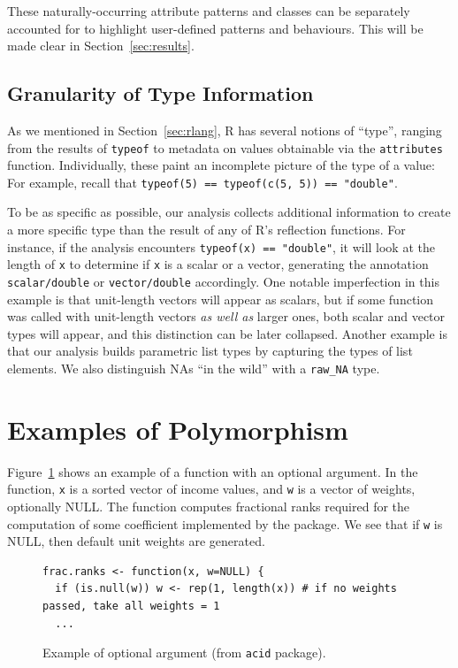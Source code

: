 \documentclass[acmsmall,10pt,review,anonymous]{acmart}\settopmatter{printfolios=true,printccs=false,printacmref=false}
\newcommand{\code}[1]{\lstinline|#1|\xspace}
\begin{document}
These naturally-occurring attribute patterns and classes can be separately
accounted for to highlight user-defined patterns and behaviours.  This will
be made clear in Section~\ref{sec:results}.

%
%

%
\subsection{Granularity of Type Information}

As we mentioned in Section~\ref{sec:rlang}, R has several notions of
``type'', ranging from the results of \code{typeof} to metadata on values
obtainable via the \code{attributes} function.  Individually, these paint an
incomplete picture of the type of a value: For example, recall that
\code{typeof(5) == typeof(c(5, 5)) == "double"}.

To be as specific as possible, our analysis collects additional information
to create a more specific type than the result of any of R's reflection
functions.  For instance, if the analysis encounters {\tt typeof(x) ==
  "double"}, it will look at the length of {\tt x} to determine if {\tt x}
is a scalar or a vector, generating the annotation {\tt scalar/double} or
{\tt vector/double} accordingly.  One notable imperfection in this example
is that unit-length vectors will appear as scalars, but if some function was
called with unit-length vectors {\it as well as} larger ones, both scalar
and vector types will appear, and this distinction can be later collapsed.
Another example is that our analysis builds parametric list types by
capturing the types of list elements.  We also distinguish NAs ``in the
wild'' with a {\tt raw\_NA} type.

%
%
%
%
%
%
\section{Examples of Polymorphism}
\label{sec:polyex}

Figure~\ref{fig:optnull} shows an example of a function with an optional argument.
In the function, {\tt x} is a sorted vector of income values, and {\tt w} is a vector of weights, optionally NULL.
The function computes fractional ranks required for the computation of some coefficient implemented by the package.
We see that if {\tt w} is NULL, then default unit weights are generated.

\begin{figure}[!hb]{\small\begin{lstlisting}[style=R]
frac.ranks <- function(x, w=NULL) {
  if (is.null(w)) w <- rep(1, length(x)) # if no weights passed, take all weights = 1
  ...
\end{lstlisting}}\caption{Example of optional argument (from {\tt acid} package).}\label{fig:optnull}\end{figure}
\end{document}
